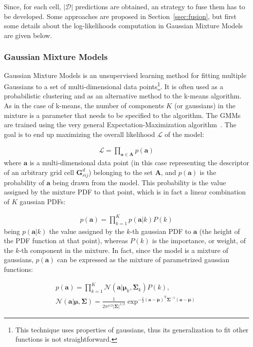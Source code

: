 \documentclass[10pt,twocolumn,letterpaper]{article}
\begin{document}
Since, for each cell, $|\mathcal{D}|$ predictions are obtained, an strategy to fuse them has to be developed. Some approaches are proposed in Section~\ref{ssec:fusion}, but first some details about the log-likelihoods computation in Gaussian Mixture Models are given below.

\subsubsection{Gaussian Mixture Models} \label{section:gmm}

Gaussian Mixture Models is an unsupervised learning method for fitting multiple Gaussians to a set of multi-dimensional data points\footnote{This technique uses properties of gaussians, thus its generalization to fit other functions is not straightforward.}. It is often used as a probabilistic clustering and as an alternative method to the k-means algorithm. As in the case of k-means, the number of components $K$ (or gaussians) in the mixture is a parameter that needs to be specified to the algorithm. The GMMs are trained using the very general Expectation-Maximization algorithm~\cite{moon1996expectation}. The goal is to end up maximizing the overall likelihood $\mathcal{L}$ of the model:

\begin{gather}
	\mathcal{L} = \prod_{\mathbf{a} \in \mathbf{A}} p(\mathbf{a})
\end{gather}
where $\mathbf{a}$ is a multi-dimensional data point (in this case representing the descriptor of an arbitrary grid cell $\mathbf{G}_{rij}^{d}$) belonging to the set $\mathbf{A}$, and $p(\mathbf{a})$ is the probability of $\mathbf{a}$ being drawn from the model. This probability is the value assigned by the mixture PDF to that point, which is in fact a linear combination of $K$ gaussian PDFs:

\begin{gather}
	p(\mathbf{a}) = \prod_{k=1}^{K} p(\mathbf{a}|k) P(k)
\end{gather}
being $p(\mathbf{a}|k)$ the value assigned by the $k$-th gaussian PDF to $\mathbf{a}$ (the height of the PDF function at that point), whereas $P(k)$ is the importance, or weight, of the $k$-th component in the mixture. In fact, since the model is a mixture of gaussians, $p(\mathbf{a})$ can be expressed as the mixture of parametrized gaussian functions:

\begin{gather}
	p(\mathbf{a}) = \prod_{k=1}^{K} \mathcal{N}(\mathbf{a}|\boldsymbol{\mu}_{k}, \mathbf{\Sigma}_{k}) P(k), \\
	\mathcal{N}(\mathbf{a}|\boldsymbol{\mu},\mathbf{\Sigma}) = \frac{1}{2\pi^{\rho/2}|\mathbf{\Sigma}|^{1/2}} \exp^{-\frac{1}{2} (\mathbf{a}-\boldsymbol{\mu})^\mathrm{T} \mathbf{\Sigma}^{-1} (\mathbf{a}-\boldsymbol{\mu}) }
\end{gather}
\end{document}
